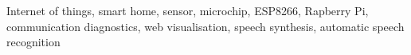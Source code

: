
    
\begin{keywords} 
    \vspace{1cm}
    
    Internet of things, smart home, sensor, microchip, ESP8266, Rapberry Pi, communication diagnostics, web visualisation, speech synthesis, automatic speech recognition
    
\end{keywords}